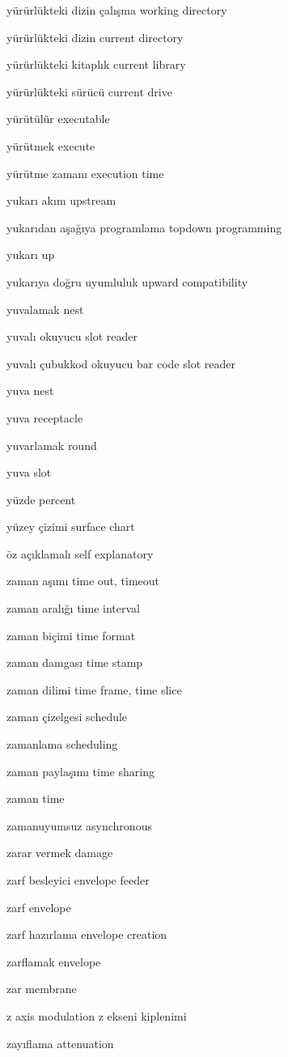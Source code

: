 \documentclass[12pt,fleqn]{article}\usepackage{../../common}
\begin{document}
yürürlükteki dizin çalışma working directory

yürürlükteki dizin current directory

yürürlükteki kitaplık current library

yürürlükteki sürücü current drive

yürütülür executable

yürütmek execute

yürütme zamanı execution time

yukarı akım upstream

yukarıdan aşağıya programlama topdown programming

yukarı up

yukarıya doğru uyumluluk upward compatibility

yuvalamak nest

yuvalı okuyucu slot reader

yuvalı çubukkod okuyucu bar code slot reader

yuva nest

yuva receptacle

yuvarlamak round

yuva slot

yüzde percent

yüzey çizimi surface chart

öz açıklamalı self explanatory

zaman aşımı time out, timeout

zaman aralığı time interval

zaman biçimi time format

zaman damgası time stamp

zaman dilimi time frame, time slice

zaman çizelgesi schedule

zamanlama scheduling

zaman paylaşımı time sharing

zaman time

zamanuyumsuz asynchronous

zarar vermek damage

zarf besleyici envelope feeder

zarf envelope

zarf hazırlama envelope creation

zarflamak envelope

zar membrane

z axis modulation z ekseni kiplenimi

zayıflama attenuation
\end{document}
